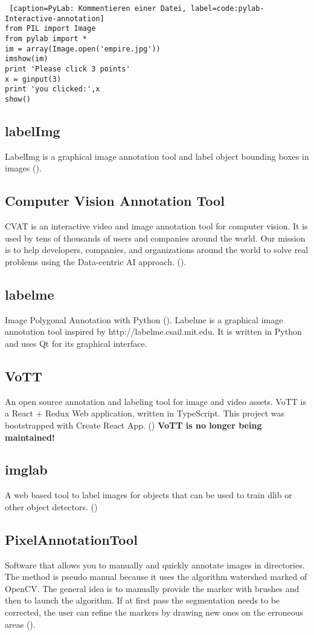 \begin{lstlisting} [caption=PyLab: Kommentieren einer Datei, label=code:pylab-Interactive-annotation]
from PIL import Image
from pylab import *
im = array(Image.open('empire.jpg'))
imshow(im)
print 'Please click 3 points'
x = ginput(3)
print 'you clicked:',x
show()
\end{lstlisting}

\subsection*{labelImg}
LabelImg is a graphical image annotation tool and label object bounding boxes in images (\cite[][]{labelImg-link}).

\subsection*{Computer Vision Annotation Tool }
CVAT is an interactive video and image annotation tool for computer vision. It is used by tens of thousands of users and companies around the world. Our mission is to help developers, companies, and organizations around the world to solve real problems using the Data-centric AI approach. (\cite[][]{CVAT-link}).

\subsection*{labelme}
Image Polygonal Annotation with Python (\cite[][]{labelme-link}).
Labelme is a graphical image annotation tool inspired by http://labelme.csail.mit.edu.
It is written in Python and uses Qt for its graphical interface.

\subsection*{VoTT}
An open source annotation and labeling tool for image and video assets.
VoTT is a React + Redux Web application, written in TypeScript. This project was bootstrapped with Create React App. (\cite[][]{VoTT-link})
\textbf{VoTT is no longer being maintained!}

\subsection*{imglab}
A web based tool to label images for objects that can be used to train dlib or other object detectors. (\cite[][]{imglab-link})

\subsection*{PixelAnnotationTool}
Software that allows you to manually and quickly annotate images in directories. The method is pseudo manual because it uses the algorithm watershed marked of OpenCV. The general idea is to manually provide the marker with brushes and then to launch the algorithm. If at first pass the segmentation needs to be corrected, the user can refine the markers by drawing new ones on the erroneous areas (\cite[][]{PixelAnnotationTool-link}).



